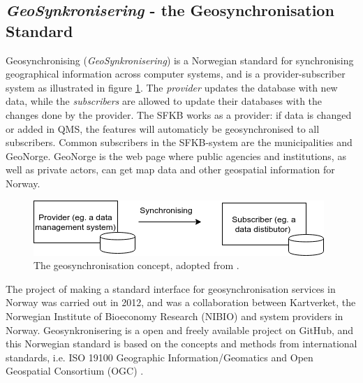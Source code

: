 


\subsection{\textit{GeoSynkronisering} - the Geosynchronisation Standard}\label{geosync}

Geosynchronising (\textit{GeoSynkronisering}) is a Norwegian standard for synchronising geographical information across computer systems, and is a provider-subscriber system as illustrated in figure \ref{fig:geosync}. The \textit{provider} updates the database with new data, while the \textit{subscribers} are allowed to update their databases with the changes done by the provider. The SFKB works as a provider: if data is changed or added in QMS, the features will automaticly be geosynchronised to all subscribers. Common subscribers in the SFKB-system are the municipalities and GeoNorge. GeoNorge is the web page where public agencies and institutions, as well as private actors, can get map data and other geospatial information for Norway.  
\\
\begin{figure}[H]
	\centering
	\includegraphics[scale=0.6]{img/geosync.png}
	\caption{The geosynchronisation concept, adopted from \cite[p.~16]{Kartverket2013}. }
	\label{fig:geosync}
\end{figure}


The project of making a standard interface for geosynchronisation services in Norway was carried out in 2012, and was a collaboration between Kartverket, the Norwegian Institute of Bioeconomy Research (NIBIO) and system providers in Norway. Geosynkronisering is a open and freely available project on GitHub, and this Norwegian standard is based on the concepts and methods from international standards, i.e. ISO 19100 Geographic Information/Geomatics and Open Geospatial Consortium (OGC) \citep{Eggan2017,Kartverket2013}.

